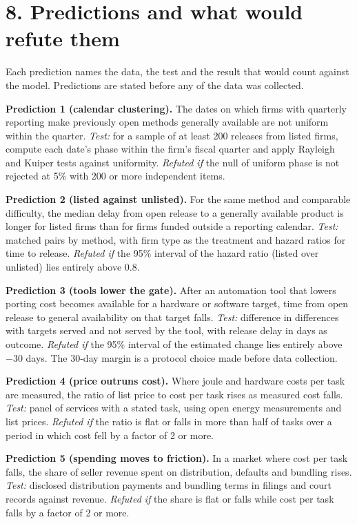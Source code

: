 \documentclass[10pt,letterpaper]{article}
\begin{document}
\section{8. Predictions and what would refute
them}\label{predictions-and-what-would-refute-them}

Each prediction names the data, the test and the result that would count
against the model. Predictions are stated before any of the data was
collected.

\textbf{Prediction 1 (calendar clustering).} The dates on which firms
with quarterly reporting make previously open methods generally
available are not uniform within the quarter. \emph{Test:} for a sample
of at least 200 releases from listed firms, compute each date's phase
within the firm's fiscal quarter and apply Rayleigh and Kuiper tests
against uniformity. \emph{Refuted if} the null of uniform phase is not
rejected at 5\% with 200 or more independent items.

\textbf{Prediction 2 (listed against unlisted).} For the same method and
comparable difficulty, the median delay from open release to a generally
available product is longer for listed firms than for firms funded
outside a reporting calendar. \emph{Test:} matched pairs by method, with
firm type as the treatment and hazard ratios for time to release.
\emph{Refuted if} the 95\% interval of the hazard ratio (listed over
unlisted) lies entirely above 0.8.

\textbf{Prediction 3 (tools lower the gate).} After an automation tool
that lowers porting cost becomes available for a hardware or software
target, time from open release to general availability on that target
falls. \emph{Test:} difference in differences with targets served and
not served by the tool, with release delay in days as outcome.
\emph{Refuted if} the 95\% interval of the estimated change lies
entirely above \(-30\) days. The 30-day margin is a protocol choice made
before data collection.

\textbf{Prediction 4 (price outruns cost).} Where joule and hardware
costs per task are measured, the ratio of list price to cost per task
rises as measured cost falls. \emph{Test:} panel of services with a
stated task, using open energy measurements and list prices.
\emph{Refuted if} the ratio is flat or falls in more than half of tasks
over a period in which cost fell by a factor of 2 or more.

\textbf{Prediction 5 (spending moves to friction).} In a market where
cost per task falls, the share of seller revenue spent on distribution,
defaults and bundling rises. \emph{Test:} disclosed distribution
payments and bundling terms in filings and court records against
revenue. \emph{Refuted if} the share is flat or falls while cost per
task falls by a factor of 2 or more.
\end{document}
